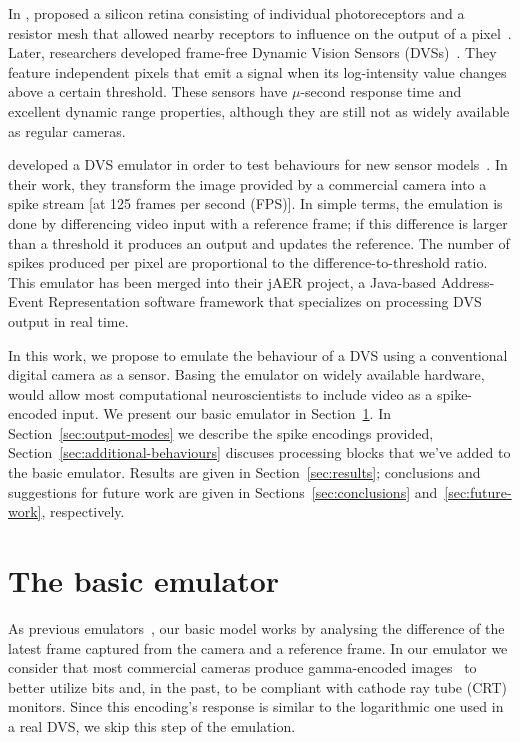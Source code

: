 \documentclass[twocolumn, a4paper]{article}
\begin{document}
In \citeyear{Mead1989}, \citeauthor{Mead1989} proposed a silicon retina consisting of individual photoreceptors and a resistor mesh that allowed nearby receptors to influence on the output of a pixel~\cite{Mead1989}. 
Later, researchers developed frame-free Dynamic Vision Sensors (DVSs)~\cite{delbruck_dvs,bernabe_dvs}. They feature independent pixels that emit a signal when its log-intensity value changes above a certain threshold. These sensors have $\mu$-second response time and excellent dynamic range properties, although they are still not as widely available as regular cameras.

\citeauthor{dvs_emu} developed a DVS emulator in order to test behaviours for new sensor models~\cite{dvs_emu}. In their work, they transform the image provided by a commercial camera into a spike stream [at 125 frames per second (FPS)]. In simple terms, the emulation is done by differencing video input with a reference frame; if this difference is larger than a threshold it produces an output and updates the reference. The number of spikes produced per pixel are proportional to the difference-to-threshold ratio. This emulator has been merged into their jAER project, a Java-based Address-Event Representation software framework that specializes on processing DVS output in real time.

In this work, we propose to emulate the behaviour of a DVS using a conventional digital camera as a sensor. Basing the emulator on widely available hardware, would allow most computational neuroscientists to include video as a spike-encoded input. We present our basic emulator in Section~\ref{sec:basic-emulator}. In Section~\ref{sec:output-modes} we describe the spike encodings provided, Section~\ref{sec:additional-behaviours} discuses processing blocks that we've added to the basic emulator. Results are given in Section~\ref{sec:results}; conclusions and suggestions for future work are given in Sections~\ref{sec:conclusions} and~\ref{sec:future-work}, respectively.


\section{The basic emulator}
\label{sec:basic-emulator}

As previous emulators~\cite{dvs_emu}, our basic model works by analysing the difference of the latest frame captured from the camera and a reference frame. 
In our emulator we consider that most commercial cameras produce gamma-encoded images~\cite{Poynton_digital_video} to better utilize bits and, in the past, to be compliant with cathode ray tube (CRT) monitors.
Since this encoding's response is similar to the logarithmic one used in a real DVS, we skip this step of the emulation.
\end{document}

